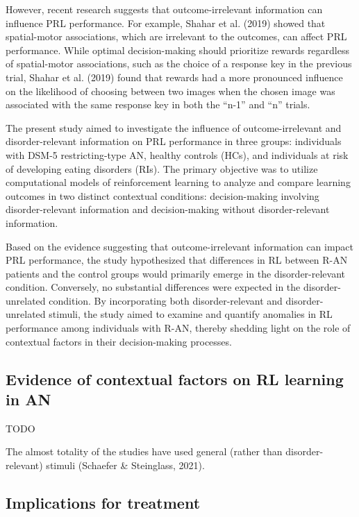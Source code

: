 \documentclass[
  man,floatsintext]{apa6}
\begin{document}
However, recent research suggests that outcome-irrelevant information can influence PRL performance. For example, Shahar et al. (2019) showed that spatial-motor associations, which are irrelevant to the outcomes, can affect PRL performance. While optimal decision-making should prioritize rewards regardless of spatial-motor associations, such as the choice of a response key in the previous trial, Shahar et al. (2019) found that rewards had a more pronounced influence on the likelihood of choosing between two images when the chosen image was associated with the same response key in both the ``n-1'' and ``n'' trials.

The present study aimed to investigate the influence of outcome-irrelevant and disorder-relevant information on PRL performance in three groups: individuals with DSM-5 restricting-type AN, healthy controls (HCs), and individuals at risk of developing eating disorders (RIs). The primary objective was to utilize computational models of reinforcement learning to analyze and compare learning outcomes in two distinct contextual conditions: decision-making involving disorder-relevant information and decision-making without disorder-relevant information.

Based on the evidence suggesting that outcome-irrelevant information can impact PRL performance, the study hypothesized that differences in RL between R-AN patients and the control groups would primarily emerge in the disorder-relevant condition. Conversely, no substantial differences were expected in the disorder-unrelated condition. By incorporating both disorder-relevant and disorder-unrelated stimuli, the study aimed to examine and quantify anomalies in RL performance among individuals with R-AN, thereby shedding light on the role of contextual factors in their decision-making processes.

\hypertarget{evidence-of-contextual-factors-on-rl-learning-in-an}{%
\subsection{Evidence of contextual factors on RL learning in AN}\label{evidence-of-contextual-factors-on-rl-learning-in-an}}

TODO

The almost totality of the studies have used general (rather than disorder-relevant) stimuli (Schaefer \& Steinglass, 2021).

\hypertarget{implications-for-treatment}{%
\subsection{Implications for treatment}\label{implications-for-treatment}}
\end{document}
